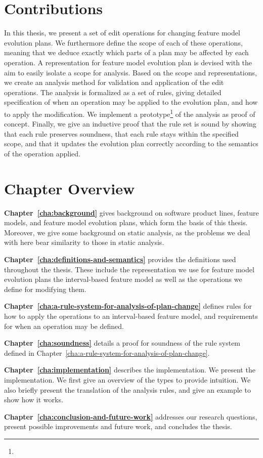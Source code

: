 \section{Contributions}

In this thesis, we present a set of edit operations for changing feature model evolution plans. We furthermore define the scope of each of these operations, meaning that we deduce exactly which parts of a plan may be affected by each operation. A representation for feature model evolution plan is devised with the aim to easily isolate a scope for analysis. Based on the scope and representations, we create an analysis method for validation and application of the edit operations. The analysis is formalized as a set of rules, giving detailed specification of when an operation may be applied to the evolution plan, and how to apply the modification. We implement a prototype\footnote{} of the analysis as proof of concept. Finally, we give an inductive proof that the rule set is sound by showing that each rule preserves soundness, that each rule stays within the specified scope, and that it updates the evolution plan correctly according to the semantics of the operation applied.

\section{Chapter Overview}
\label{sec:chapter-overview}

\textbf{Chapter~\ref{cha:background}} gives background on software product lines, feature models, and feature model evolution plans, which form the basis of this thesis. Moreover, we give some background on static analysis, as the problems we deal with here bear similarity to those in static analysis.

\textbf{Chapter~\ref{cha:definitions-and-semantics}} provides the definitions used throughout the thesis. These include the representation we use for feature model evolution plans \textemdash{} the interval-based feature model \textemdash{} as well as the operations we define for modifying them. 

\textbf{Chapter~\ref{cha:a-rule-system-for-analysis-of-plan-change}} defines rules for how to apply the operations to an interval-based feature model, and requirements for when an operation may be defined.

\textbf{Chapter~\ref{cha:soundness}} details a proof for soundness of the rule system defined in Chapter~\vref{cha:a-rule-system-for-analysis-of-plan-change}.

\textbf{Chapter~\ref{cha:implementation}} describes the implementation. We present the implementation. We first give an overview of the types to provide intuition. We also briefly present the translation of the analysis rules, and give an example to show how it works.

\textbf{Chapter~\ref{cha:conclusion-and-future-work}} addresses our research questions, present possible improvements and future work, and concludes the thesis.
